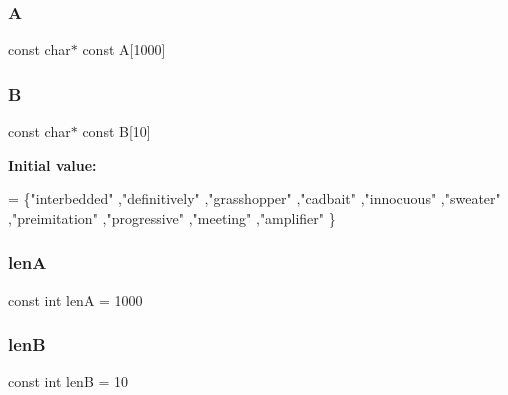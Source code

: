 \subsubsection{\texorpdfstring{A}{A}}
{\footnotesize\ttfamily const char$\ast$ const A\mbox{[}1000\mbox{]}}

\mbox{\label{tests-bloom-sets_8h_aa1d3c5d0f3494870dbcab1da034256b9}} 
\subsubsection{\texorpdfstring{B}{B}}
{\footnotesize\ttfamily const char$\ast$ const B\mbox{[}10\mbox{]}}

{\bfseries Initial value\+:}
\begin{DoxyCode}
= \{\textcolor{stringliteral}{"interbedded"}
,\textcolor{stringliteral}{"definitively"}
,\textcolor{stringliteral}{"grasshopper"}
,\textcolor{stringliteral}{"cadbait"}
,\textcolor{stringliteral}{"innocuous"}
,\textcolor{stringliteral}{"sweater"}
,\textcolor{stringliteral}{"preimitation"}
,\textcolor{stringliteral}{"progressive"}
,\textcolor{stringliteral}{"meeting"}
,\textcolor{stringliteral}{"amplifier"}
\}
\end{DoxyCode}
\mbox{\label{tests-bloom-sets_8h_a9d1d21784df288cdc401892549fd7bb9}} 
\subsubsection{\texorpdfstring{lenA}{lenA}}
{\footnotesize\ttfamily const int lenA = 1000}

\mbox{\label{tests-bloom-sets_8h_a3b106264c2b9acbabae5c70249d93614}} 
\subsubsection{\texorpdfstring{lenB}{lenB}}
{\footnotesize\ttfamily const int lenB = 10}

